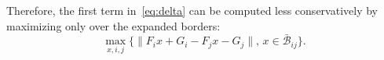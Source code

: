  Therefore, the first term in~\autoref{eq:delta} can be computed less conservatively by maximizing only over 
 the expanded borders:
 \begin{equation}
 \label{eq:maximization}
 \max_{x,i,j}\{\|F_ix+G_i-F_jx-G_j\|,\,x\in \bar{\mathcal B}_{ij}\}.
 \end{equation} 
 




